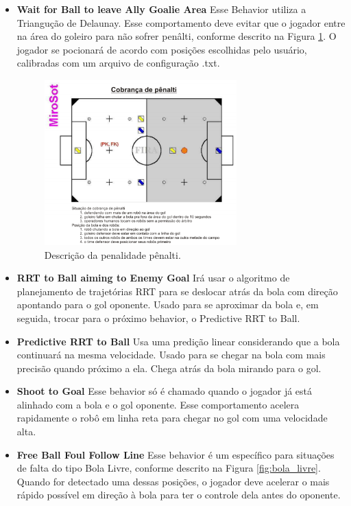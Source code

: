 \documentclass[10pt,fleqn,a4paper]{article}
\begin{document}
\begin{itemize}

\item \textbf{Wait for Ball to leave Ally Goalie Area} Esse Behavior utiliza a Triangução de Delaunay. Esse comportamento deve evitar que o jogador entre na área do goleiro para não sofrer penâlti, conforme descrito na Figura \ref{fig:penalty}. O jogador se pocionará de acordo com posições escolhidas pelo usuário, calibradas com um arquivo de configuração .txt.

\begin{figure}[H]
	\centering
	\includegraphics[width=0.7\textwidth]{figures/campo_penalty.png}
   \caption{Descrição da penalidade pênalti.} \label{fig:penalty}
\end{figure}

\item \textbf{RRT to Ball aiming to Enemy Goal} Irá usar o algoritmo de planejamento de trajetórias RRT para se deslocar atrás da bola com direção apontando para o gol oponente. Usado para se aproximar da bola e, em seguida, trocar para o próximo behavior, o Predictive RRT to Ball.

\item \textbf{Predictive RRT to Ball} Usa uma predição linear considerando que a bola continuará na mesma velocidade. Usado para se chegar na bola com mais precisão quando próximo a ela. Chega atrás da bola mirando para o gol.

\item \textbf{Shoot to Goal} Esse behavior só é chamado quando o jogador já está alinhado com a bola e o gol oponente. Esse comportamento acelera rapidamente o robô em linha reta para chegar no gol com uma velocidade alta.

\item \textbf{Free Ball Foul Follow Line} Esse behavior é um específico para situações de falta do tipo Bola Livre, conforme descrito na Figura \ref{fig:bola_livre}. Quando for detectado uma dessas posições, o jogador deve acelerar o mais rápido possível em direção à bola para ter o controle dela antes do oponente.


\end{itemize}
\end{document}
